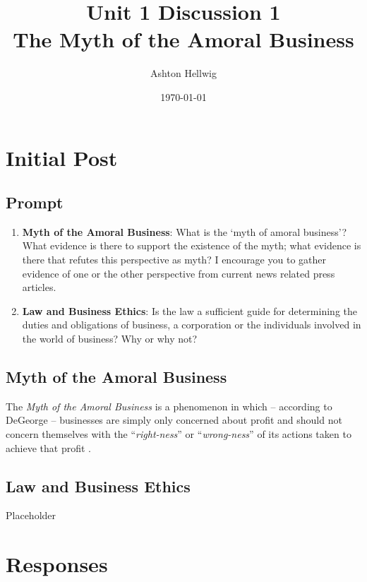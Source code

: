 \documentclass[12pt]{article}
\title{%
    Unit 1 Discussion 1\\%
    \large{The Myth of the Amoral Business}
  }
\author{Ashton Hellwig}
\date{\today}
\begin{document}
  \maketitle
  
  \section{Initial Post}
    \begin{mdframed}
      \vspace{-10pt}
      \subsection*{Prompt}
      \begin{enumerate}
        \item \textbf{Myth of the Amoral Business}: What is the ‘myth of amoral business’? What evidence is
        there to support the existence of the myth; what evidence is there that refutes this perspective as
          myth? I encourage you to gather evidence of one or the other perspective from current news related press articles.
        \item \textbf{Law and Business Ethics}: Is the law a sufficient guide for determining the duties and
          obligations of business, a corporation or the individuals involved in the world of business? Why or
          why not?
      \end{enumerate}
    \end{mdframed}
  
    \subsection{Myth of the Amoral Business}
      The \textit{Myth of the Amoral Business} is a phenomenon in which -- according to DeGeorge --
        businesses are simply only concerned about profit and should not concern themselves with the
        ``\textit{right-ness}'' or ``\textit{wrong-ness}'' of its actions taken to achieve that
        profit \autocite{textbook}.

    \subsection{Law and Business Ethics}
      Placeholder


  \newpage
  \section{Responses}
\end{document}
